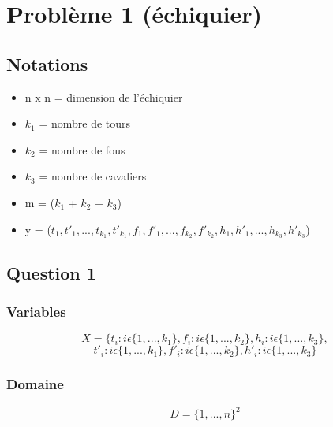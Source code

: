 \documentclass[a4paper,11pt]{article}
\begin{document}
\section{Problème 1 (échiquier)}
\subsection{Notations}
\begin{itemize}
\item n x n = dimension de l'échiquier
\item $k_{1}$ = nombre de tours
\item $k_{2}$ = nombre de fous
\item $k_{3}$ = nombre de cavaliers

\item m = ($k_{1}$ + $k_{2}$ + $k_{3}$)
\item y = ($t_{1}, t'_{1}, ..., t_{k_{1}}, t'_{k_{1}}, f_{1}, f'_{1}, ..., f_{k_{2}}, f'_{k_{2}}, h_{1}, h'_{1}, ..., h_{k_{3}}, h'_{k_{3}}$)
\end{itemize}

\subsection{Question 1}
\subsubsection{Variables}
$$X = \{t_{i} : i \epsilon  \{1, ..., k_{1} \}, f_{i} : i \epsilon  \{1, ..., k_{2} \}, h_{i} : i \epsilon  \{1, ..., k_{3} \}, $$ 
\hspace{10mm} $$t'_{i} : i \epsilon  \{1, ..., k_{1} \}, f'_{i} : i \epsilon  \{1, ..., k_{2} \}, h'_{i} : i \epsilon  \{1, ..., k_{3} \}$$

\subsubsection{Domaine}
$$D = \{1, ..., n \}^{2}$$
\end{document}

